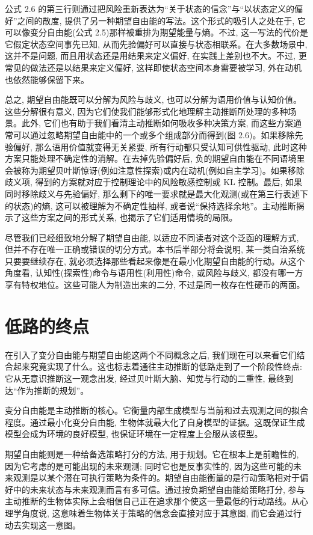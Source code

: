 公式 2.6 的第三行则通过把风险重新表达为``关于状态的信念''与``以状态定义的偏好''之间的散度, 提供了另一种期望自由能的写法。这个形式的吸引人之处在于, 它可以像变分自由能(公式 2.5)那样被重排为期望能量与熵。不过, 这一写法的代价是它假定状态空间事先已知, 从而先验偏好可以直接与状态相联系。在大多数场景中, 这并不是问题, 而且用状态还是用结果来定义偏好, 在实践上差别也不大。不过, 更常见的做法还是以结果来定义偏好, 这样即使状态空间本身需要被学习, 外在动机也依然能够保留下来。

总之, 期望自由能既可以分解为风险与歧义, 也可以分解为语用价值与认知价值。这些分解很有意义, 因为它们使我们能够形式化地理解主动推断所处理的多种场景。此外, 它们也有助于我们看清主动推断如何吸收多种决策方案, 而这些方案通常可以通过忽略期望自由能中的一个或多个组成部分而得到(图 2.6)。如果移除先验偏好, 那么语用价值就变得无关紧要, 所有行动都只受认知可供性驱动, 此时这种方案只能处理不确定性的消解。在去掉先验偏好后, 负的期望自由能在不同语境里会被称为期望贝叶斯惊讶(例如注意性探索)或内在动机(例如自主学习)。如果移除歧义项, 得到的方案就对应于控制理论中的风险敏感控制或 KL 控制。最后, 如果同时移除歧义与先验偏好, 那么剩下的唯一要求就是最大化观测(或在第三行表述下的状态)的熵, 这可以被理解为不确定性抽样, 或者说``保持选择余地''。主动推断揭示了这些方案之间的形式关系, 也揭示了它们适用情境的局限。

尽管我们已经细致地分解了期望自由能, 以适应不同读者对这个泛函的理解方式, 但并不存在唯一正确或错误的切分方式。本书后半部分将会说明, 某一类自治系统只要要继续存在, 就必须选择那些看起来像是在最小化期望自由能的行动。从这个角度看, 认知性(探索性)命令与语用性(利用性)命令, 或风险与歧义, 都没有哪一方享有特权地位。这些可能人为制造出来的二分, 不过是同一枚存在性硬币的两面。

\section{低路的终点}

在引入了变分自由能与期望自由能这两个不同概念之后, 我们现在可以来看它们结合起来究竟实现了什么。这也标志着通往主动推断的低路走到了一个阶段性终点: 它从无意识推断这一观念出发, 经过贝叶斯大脑、知觉与行动的二重性, 最终到达``作为推断的规划''。

变分自由能是主动推断的核心。它衡量内部生成模型与当前和过去观测之间的拟合程度。通过最小化变分自由能, 生物体就最大化了自身模型的证据。这既保证生成模型会成为环境的良好模型, 也保证环境在一定程度上会服从该模型。

期望自由能则是一种给备选策略打分的方法, 用于规划。它在根本上是前瞻性的, 因为它考虑的是可能出现的未来观测; 同时它也是反事实性的, 因为这些可能的未来观测是以某个潜在可执行策略为条件的。期望自由能衡量的是行动策略相对于偏好中的未来状态与未来观测而言有多可信。通过按负期望自由能给策略打分, 参与主动推断的生物体实际上会相信自己正在追求那个使这一量最低的行动路线。从心理学角度说, 这意味着生物体关于策略的信念会直接对应于其意图, 而它会通过行动去实现这一意图。

